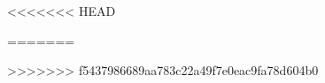 \documentclass[a4paper, parskip=half]{scrartcl}
\begin{document}
\myTitlepage
\tableofcontents
\newpage
<<<<<<< HEAD

	
	
	
	

=======
	
\newpage
	
>>>>>>> f5437986689aa783c22a49f7e0eac9fa78d604b0
\end{document}
